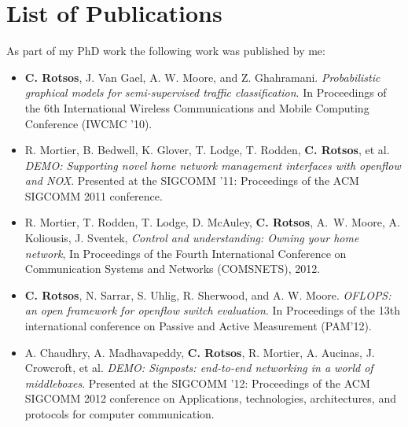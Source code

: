 
\chapter*{List of Publications} \label{sec:intro:pubs}
As part of my PhD work the following work was published by me:
\begin{itemize}
  \item \textbf{C. Rotsos}, J. Van Gael, A. W. Moore, and Z.  Ghahramani.
        \textit{Probabilistic graphical models for semi-supervised traffic
          classification}. In Proceedings of the 6th International Wireless
        Communications and Mobile Computing Conference (IWCMC '10).
    
  \item R. Mortier, B. Bedwell, K. Glover, T. Lodge, T. Rodden, \textbf{C.
        Rotsos}, et al. \textit{DEMO: Supporting novel home network management
        interfaces with openflow and NOX}. Presented at the SIGCOMM '11:
      Proceedings of the ACM SIGCOMM 2011 conference.


 
  \item R. Mortier, T. Rodden, T. Lodge, D. McAuley, \textbf{C. Rotsos}, A.~W.
        Moore, A. Koliousis, J. Sventek, \textit{Control and understanding:
          Owning your home network}, In Proceedings of the Fourth International
        Conference on Communication Systems and Networks (COMSNETS), 2012. 
  
  \item \textbf{C. Rotsos}, N. Sarrar, S. Uhlig, R. Sherwood,
        and A. W. Moore. \textit{OFLOPS: an open framework for openflow
          switch evaluation}. In Proceedings of the 13th international
        conference on Passive and Active Measurement (PAM'12). 

  \item A. Chaudhry, A. Madhavapeddy, \textbf{C. Rotsos}, R. Mortier,
        A. Aucinas, J. Crowcroft, et al. \textit{DEMO: Signposts:
          end-to-end networking in a world of middleboxes}. Presented at
        the SIGCOMM '12: Proceedings of the ACM SIGCOMM 2012 conference
        on Applications, technologies, architectures, and protocols for
        computer communication.


\end{itemize}
